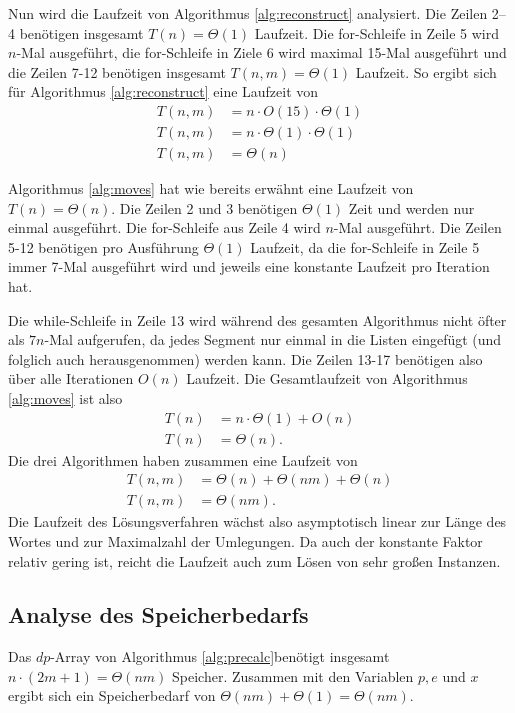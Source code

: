 \documentclass[a4paper,10pt,ngerman]{scrartcl}
\begin{document}
Nun wird die Laufzeit von Algorithmus \ref{alg:reconstruct} analysiert.
Die Zeilen 2--4 benötigen insgesamt $T(n) = \Theta(1)$ Laufzeit. 
Die for-Schleife in Zeile 5 wird $n$-Mal ausgeführt, die for-Schleife in Ziele 6 wird maximal 15-Mal ausgeführt und die Zeilen 7-12 benötigen insgesamt $T(n,m) = \Theta(1)$ Laufzeit. 
So ergibt sich für Algorithmus \ref{alg:reconstruct} eine Laufzeit von 
\begin{align*}
    T(n,m) &= n \cdot O(15) \cdot \Theta(1)\\
    T(n, m) &= n \cdot \Theta(1) \cdot \Theta(1)\\
    T(n, m) &= \Theta(n)
\end{align*}

Algorithmus \ref{alg:moves} hat wie bereits erwähnt eine Laufzeit von $T(n) = \Theta(n)$. Die Zeilen 2 und 3 benötigen $\Theta(1)$ Zeit und werden nur einmal ausgeführt. 
Die for-Schleife aus Zeile 4 wird $n$-Mal ausgeführt. 
Die Zeilen 5-12 benötigen pro Ausführung $\Theta(1)$ Laufzeit, da die for-Schleife in Zeile 5 immer 7-Mal ausgeführt wird und jeweils eine konstante Laufzeit pro Iteration hat. 

Die while-Schleife in Zeile 13 wird während des gesamten Algorithmus nicht öfter als $7n$-Mal aufgerufen, da jedes Segment nur einmal in die Listen eingefügt (und folglich auch herausgenommen) werden kann. Die Zeilen 13-17 benötigen also über alle Iterationen $O(n)$ Laufzeit.
Die Gesamtlaufzeit von Algorithmus \ref{alg:moves} ist also 
\begin{align*}
    T(n) &= n \cdot \Theta(1) + O(n)\\
    T(n) &= \Theta(n).
\end{align*}
Die drei Algorithmen haben zusammen eine Laufzeit von 
\begin{align*}
    T(n, m) &= \Theta(n) + \Theta(nm) + \Theta(n)\\
    T(n, m) &= \Theta(nm).
\end{align*}
Die Laufzeit des Lösungsverfahren wächst also asymptotisch linear zur Länge des Wortes und zur Maximalzahl der Umlegungen. 
Da auch der konstante Faktor relativ gering ist, reicht die Laufzeit auch zum Lösen von sehr großen Instanzen.

\subsection{Analyse des Speicherbedarfs}
Das $dp$-Array von Algorithmus \ref{alg:precalc}benötigt insgesamt $n \cdot (2m + 1) = \Theta(nm)$ Speicher. Zusammen mit den Variablen $p, e$ und $x$ ergibt sich ein Speicherbedarf von $\Theta(nm) + \Theta(1) = \Theta(nm)$.
\end{document}
